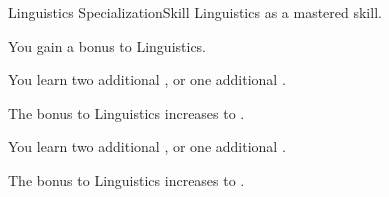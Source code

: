     \begin{feat}{Linguistics Specialization}{Skill}
        \featpre Linguistics as a mastered skill.

         You gain a  bonus to Linguistics.

         You learn two additional , or one additional .

         The bonus to Linguistics increases to .

         You learn two additional , or one additional .

         The bonus to Linguistics increases to .
    \end{feat}

